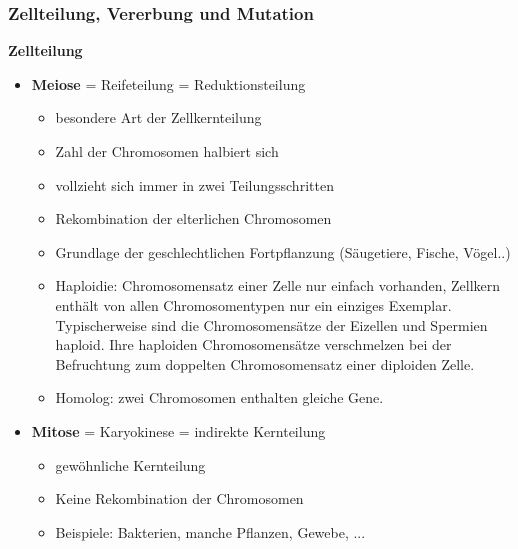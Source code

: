 \subsubsection{Zellteilung, Vererbung und Mutation}
\textbf{Zellteilung}
\begin{itemize}
	\item \textbf{Meiose} = Reifeteilung = Reduktionsteilung
	\begin{itemize}
		\item besondere Art der Zellkernteilung
		\item Zahl der Chromosomen halbiert sich
		\item vollzieht sich immer in zwei Teilungsschritten
		\item Rekombination der elterlichen Chromosomen
		\item Grundlage der geschlechtlichen Fortpflanzung (Säugetiere, Fische, Vögel..)
		\item Haploidie: Chromosomensatz einer Zelle nur einfach vorhanden, Zellkern enthält von allen Chromosomentypen nur ein einziges Exemplar.
		Typischerweise sind die Chromosomensätze der Eizellen und Spermien haploid. Ihre haploiden Chromosomensätze verschmelzen bei der Befruchtung zum doppelten Chromosomensatz einer diploiden Zelle.
		\item Homolog: zwei Chromosomen enthalten gleiche Gene.
	\end{itemize}
	\item \textbf{Mitose} = Karyokinese = indirekte Kernteilung
	\begin{itemize}
		\item gewöhnliche Kernteilung
		\item Keine Rekombination der Chromosomen
		\item Beispiele: Bakterien, manche Pflanzen, Gewebe, ...
	\end{itemize}
\end{itemize}
%
